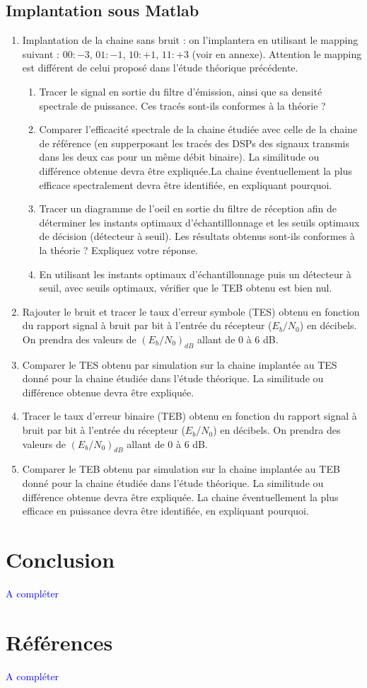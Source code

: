 \documentclass{article}
\begin{document}
\subsection{Implantation sous Matlab}
\begin{enumerate}
        \item Implantation de la chaine sans bruit : on l'implantera en utilisant le mapping suivant : $00: -3$,  $01: -1$, $10: +1$,  $11: +3$ (voir en annexe). Attention le mapping est différent de celui proposé dans l'étude théorique précédente.
            \begin{enumerate}
                \item Tracer le signal en sortie du filtre d'émission, ainsi que sa densité spectrale de puissance. Ces tracés sont-ils conformes à la théorie ?
                \item Comparer l'efficacité spectrale de la chaine étudiée avec celle de la chaine de référence (en supperposant les tracés des DSPs des signaux transmis dans les deux cas pour un même débit binaire). La similitude ou différence obtenue devra être expliquée.La chaine éventuellement la plus efficace spectralement devra être identifiée, en expliquant pourquoi.
                \item Tracer un diagramme de l'oeil en sortie du filtre de réception afin de déterminer les instants optimaux d'échantilllonnage et les seuils optimaux de décision (détecteur à seuil). Les résultats obtenus sont-ils conformes à la théorie ? Expliquez votre réponse.
                \item En utilisant les instants optimaux d'échantillonnage puis un détecteur à seuil, avec seuils optimaux, vérifier que le TEB obtenu est bien nul.
            \end{enumerate}
        \item Rajouter le bruit et tracer le taux d'erreur symbole (TES) obtenu en fonction du rapport signal à bruit par bit à l'entrée du récepteur ($E_b/N_0$) en décibels. On prendra des valeurs de $\left(E_b/N_0\right)_{dB}$ allant de $0$ à $6$ dB.
        \item Comparer le TES obtenu par simulation sur la chaine implantée au TES donné pour la chaine étudiée dans l'étude théorique. La similitude ou différence obtenue devra être expliquée.
        \item Tracer le taux d'erreur binaire (TEB) obtenu en fonction du rapport signal à bruit par bit à l'entrée du récepteur ($E_b/N_0$) en décibels. On prendra des valeurs de $\left(E_b/N_0\right)_{dB}$ allant de $0$ à $6$ dB.
        \item Comparer le TEB obtenu par simulation sur la chaine implantée au TEB donné pour la chaine étudiée dans l'étude théorique. La similitude ou différence obtenue devra être expliquée. La chaine éventuellement la plus efficace en puissance devra être identifiée, en expliquant pourquoi.\\
    \end{enumerate}

\section{Conclusion}
\textcolor{blue}{A compléter}

\section{Références}
\textcolor{blue}{A compléter}
\end{document}
